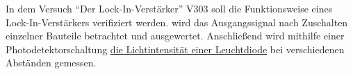 In dem Versuch \enquote{Der Lock-In-Verstärker} V303 soll die Funktionsweise eines Lock-In-Verstärkers verifiziert werden.
 wird das Ausgangssignal nach Zuschalten
einzelner Bauteile betrachtet und ausgewertet. Anschließend wird
mithilfe einer Photodetektorschaltung \uline{die Lichtintensität einer Leuchtdiode} bei verschiedenen Abständen gemessen.
